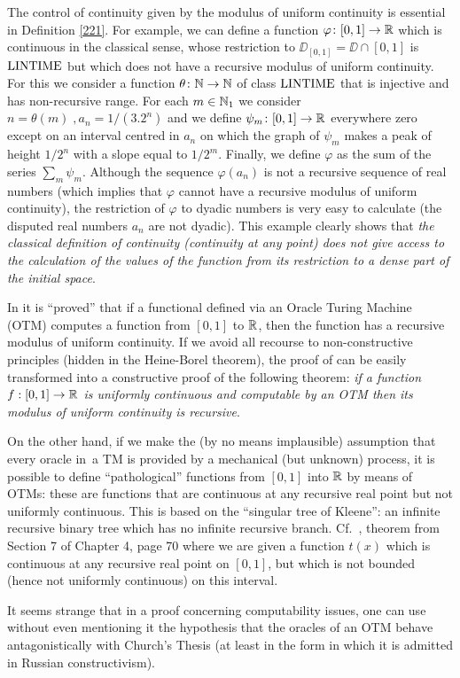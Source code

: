 \begin{remark}\label{224} 
The control of continuity given by the modulus of uniform continuity is essential in Definition \ref{221}. For example, we can define a function $\varphi\colon [0,1] \to \mathbb {R}$ which is continuous in the classical sense, whose restriction to $\DD_{[0,1]} = \DD\cap [0,1]$ is ${\rm LINTIME}$ but which does not have a recursive modulus of uniform continuity. For this we consider a function $\theta\colon \mathbb {N} \to \mathbb {N}$ of class ${\rm LINTIME}$ that is injective and has non-recursive range. For each $m \in \mathbb {N}_1$ we consider $n = \theta(m)\; , a_n = 1/(3.2^n)$ and we define $\psi_m\colon [0,1] \to\mathbb {R}$ everywhere zero except on an interval centred in $a_n$ on which the graph of $\psi_m$ makes a peak of height $1/2^n$ with a slope equal to $1/2^m$. 
Finally, we define $\varphi$ as the sum of the series $\sum_m \psi_m$. Although the sequence $\varphi(a_n)$ is not a recursive sequence of real numbers (which implies that $\varphi$ cannot have a recursive modulus of uniform continuity), the restriction of $\varphi$ to dyadic numbers is very easy to calculate (the disputed real numbers $a_n$ are not dyadic). 
This example clearly shows that {\em the classical definition of continuity (continuity at any point) does not give access to the calculation of the values of the function from its restriction to a dense part of the initial space}.
\end{remark}

\begin{remark}\label{225}
In \cite{KF82} it is ``proved'' that if a functional defined via an Oracle Turing Machine (OTM) computes a function from $[0,1]$ to $\mathbb {R}$, then the function has a recursive modulus of uniform continuity. If we avoid all recourse to non-constructive principles (hidden in the Heine-Borel theorem), the proof of \cite{KF82} can be easily transformed into a constructive proof of the following theorem: 
\emph{if a function $f:[0,1] \to \mathbb {R}$ is uniformly continuous and computable by an OTM then its modulus of uniform continuity is recursive}.

\noindent 
On the other hand, if we make the (by no means implausible) assumption that every oracle in~a TM is provided by a mechanical (but unknown) process, it is possible to define ``pathological'' functions from $[0,1]$ into $\mathbb {R}$ by means of OTMs: these are functions that are continuous at any recursive real point but not uniformly continuous. 
This is based on the ``singular tree of Kleene'': an infinite recursive binary tree which has no infinite recursive branch. Cf.\ \cite{Be}, theorem from Section 7 of Chapter 4, page 70 where we are given a function $t(x)$ which is continuous at any recursive real point on $[0,1]$, but which is not bounded (hence not uniformly continuous) on this interval.

\noindent 
It seems strange that in a proof concerning computability issues, one can use without even mentioning it the hypothesis that the oracles of an OTM behave antagonistically with Church's Thesis (at least in the form in which it is admitted in Russian constructivism).
\end{remark}

